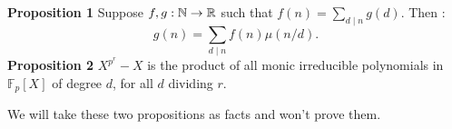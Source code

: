 
\begin{thisnote}
    \textbf{Proposition 1} Suppose $f,g :\mathbb{N}\to \mathbb{R}$ such that $f(n) = \sum_{d\mid n} g(d)$. Then :
    \[g(n) = \sum_{d\mid n} f(n)\mu(n/d).\]
    \textbf{Proposition 2} $X^{p^r}-X$ is the product of all monic irreducible polynomials in $\mathbb{F}_p[X]$ of degree $d$, for all $d$ dividing $r$.
\end{thisnote}

We will take these two propositions as facts and won't prove them.


